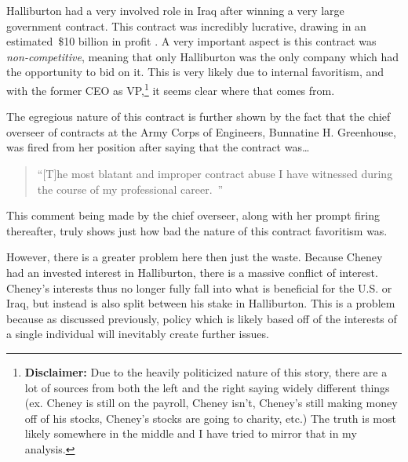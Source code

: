 \documentclass[12pt, twoside]{article}
\begin{document}
        Halliburton had a very involved role in Iraq after winning a very large government contract. This contract was incredibly lucrative, drawing in an estimated~\$10 billion in profit \parencite{nytimes2005halliburtoncontract}. A very important aspect is this contract was \textit{non-competitive}, meaning that only Halliburton was the only company which had the opportunity to bid on it. \parencite{bbc2008iraqcontracts} This is very likely due to internal favoritism, and with the former CEO as VP,\footnote{\textbf{Disclaimer:} Due to the heavily politicized nature of this story, there are a lot of sources from both the left and the right saying widely different things (ex. Cheney is still on the payroll, Cheney isn't, Cheney's still making money off of his stocks, Cheney's stocks are going to charity, etc.) The truth is most likely somewhere in the middle and I have tried to mirror that in my analysis.}
        it seems clear where that comes from. 
        
        The egregious nature of this contract is further shown by the fact that the chief overseer of contracts at the Army Corps of Engineers, Bunnatine H. Greenhouse, was fired from her position after saying that the contract was\ldots

        \begin{quote}
            ``[T]he most blatant and improper contract abuse I have witnessed during the course of my professional career.~\parencite{nytimes2005halliburtoncontract}''
        \end{quote}  

        This comment being made by the chief overseer, along with her prompt firing thereafter, truly shows just how bad the nature of this contract favoritism was. 

        However, there is a greater problem here then just the waste. Because Cheney had an invested interest in Halliburton, there is a massive conflict of interest. Cheney's interests thus no longer fully fall into what is beneficial for the U.S. or Iraq, but instead is also split between his stake in Halliburton. This is a problem because as discussed previously, policy which is likely based off of the interests of a single individual will inevitably create further issues.
        
        
\end{document}
